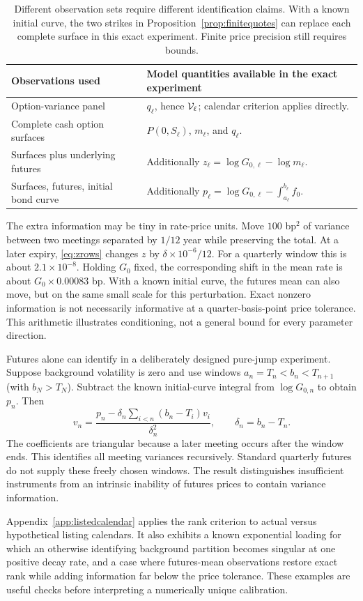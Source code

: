 \begin{table}[ht]
\centering\small
\begin{tabular}{p{}p{}}
\toprule
Observations used & Model quantities available in the exact experiment\\
\midrule
Option-variance panel & $q_\ell$, hence $\mathcal V_\ell$; calendar criterion applies directly.\\
Complete cash option surfaces & $P(0,S_\ell)$, $m_\ell$, and $q_\ell$.\\
Surfaces plus underlying futures & Additionally $z_\ell=\log G_{0,\ell}-\log m_\ell$.\\
Surfaces, futures, initial bond curve & Additionally $p_\ell=\log G_{0,\ell}-\int_{a_\ell}^{b_\ell}f_0$.\\
\bottomrule
\end{tabular}
\caption{Different observation sets require different identification claims. With a known initial curve, the two strikes in Proposition~\ref{prop:finitequotes} can replace each complete surface in this exact experiment. Finite price precision still requires bounds.}\label{tab:observations}
\end{table}

The extra information may be tiny in rate-price units. Move $100$ bp$^2$ of variance between two meetings separated by $1/12$ year while preserving the total. At a later expiry, \eqref{eq:zrows} changes $z$ by $\delta\times10^{-6}/12$. For a quarterly window this is about $2.1\times10^{-8}$. Holding $G_0$ fixed, the corresponding shift in the mean rate is about $G_0\times0.00083$ bp. With a known initial curve, the futures mean can also move, but on the same small scale for this perturbation. Exact nonzero information is not necessarily informative at a quarter-basis-point price tolerance. This arithmetic illustrates conditioning, not a general bound for every parameter direction.

Futures alone can identify in a deliberately designed pure-jump experiment. Suppose background volatility is zero and use windows $a_n=T_n<b_n<T_{n+1}$ (with $b_N>T_N$). Subtract the known initial-curve integral from $\log G_{0,n}$ to obtain $p_n$. Then
\[
v_n=\frac{p_n-\delta_n\sum_{i<n}(b_n-T_i)v_i}{\delta_n^2},\qquad
\delta_n=b_n-T_n.
\]
The coefficients are triangular because a later meeting occurs after the window ends. This identifies all meeting variances recursively. Standard quarterly futures do not supply these freely chosen windows. The result distinguishes insufficient instruments from an intrinsic inability of futures prices to contain variance information.

Appendix~\ref{app:listedcalendar} applies the rank criterion to actual versus hypothetical listing calendars. It also exhibits a known exponential loading for which an otherwise identifying background partition becomes singular at one positive decay rate, and a case where futures-mean observations restore exact rank while adding information far below the price tolerance. These examples are useful checks before interpreting a numerically unique calibration.
